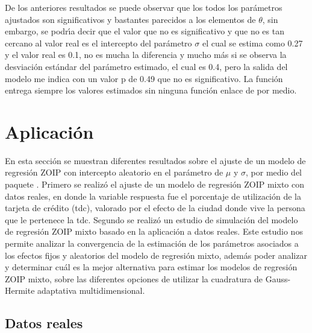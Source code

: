 De los anteriores resultados se puede observar que los todos los par\'{a}metros ajustados son significativos y bastantes parecidos a los elementos de $\theta$, sin embargo, se podr\'{\i}a decir que el valor que no es significativo y que no es tan cercano al valor real es el intercepto del par\'{a}metro $\sigma$ el cual se estima como 0.27 y el valor real es 0.1, no es mucha la diferencia y mucho m\'{a}s si se observa la desviaci\'{o}n est\'{a}ndar del par\'{a}metro estimado, el cual es 0.4, pero la salida del modelo me indica con un valor p de 0.49 que no es significativo. La funci\'{o}n  entrega siempre los valores estimados sin ninguna funci\'{o}n enlace de por medio.
 
\section{Aplicaci\'{o}n}

En esta secci\'{o}n se muestran diferentes resultados sobre el ajuste de un modelo de regresi\'{o}n ZOIP con intercepto aleatorio en el par\'{a}metro de $\mu$ y $\sigma$, por medio del paquete . Primero se realiz\'{o} el ajuste de un modelo de regresi\'{o}n ZOIP mixto con datos reales, en donde la variable respuesta fue el porcentaje de utilizaci\'{o}n de la tarjeta de cr\'{e}dito (tdc), valorado por el efecto de la ciudad donde vive la persona que le pertenece la tdc. Segundo se realiz\'{o} un estudio de simulaci\'{o}n del modelo de regresi\'{o}n ZOIP mixto basado en la aplicaci\'{o}n a datos reales. Este estudio nos permite analizar la convergencia de la estimaci\'{o}n de los pa\-r\'{a}\-me\-tros asociados a los efectos fijos y aleatorios del modelo de regresi\'{o}n mixto, adem\'{a}s poder analizar y determinar cu\'{a}l es la mejor alternativa para estimar los modelos de regresi\'{o}n ZOIP mixto, sobre las diferentes opciones de utilizar la cuadratura de Gauss-Hermite adaptativa multidimensional.

\subsection{Datos reales}

